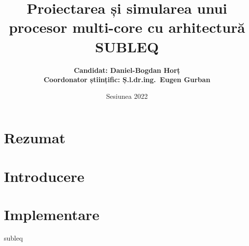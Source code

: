 \documentclass[12pt, a4paper]{uptacthesis}
\title{Proiectarea și simularea unui procesor multi-core cu arhitectură SUBLEQ}
\author{\large\bfseries
    Candidat: Daniel-Bogdan Horț\\[1ex]
    Coordonator științific: Ș.l.dr.ing.~Eugen Gurban\\[2cm]
}
\date{\large Sesiunea 2022}
\begin{document}
\maketitle

\chapter*{Rezumat}


\tableofcontents

\chapter{Introducere}


\chapter{Implementare}

\cite{asl}
\acrshort{subleq}




\cleardoublepage
{}
\listoffigures

\printnoidxglossary[type=\acronymtype, title=Listă de abrevieri]
\end{document}
